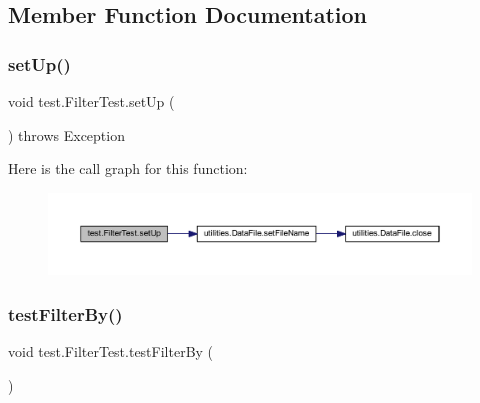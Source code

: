\subsection{Member Function Documentation}
\mbox{\label{classtest_1_1_filter_test_af76a634a6d91aad982f591ef07c21969}} 
\subsubsection{\texorpdfstring{set\+Up()}{setUp()}}
{\footnotesize\ttfamily void test.\+Filter\+Test.\+set\+Up (\begin{DoxyParamCaption}{ }\end{DoxyParamCaption}) throws Exception}

Here is the call graph for this function\+:\nopagebreak
\begin{figure}[H]
\begin{center}
\leavevmode
\includegraphics[width=350pt]{classtest_1_1_filter_test_af76a634a6d91aad982f591ef07c21969_cgraph}
\end{center}
\end{figure}
\mbox{\label{classtest_1_1_filter_test_abd2f49938ef9663ecee1953d09bae933}} 
\subsubsection{\texorpdfstring{test\+Filter\+By()}{testFilterBy()}}
{\footnotesize\ttfamily void test.\+Filter\+Test.\+test\+Filter\+By (\begin{DoxyParamCaption}{ }\end{DoxyParamCaption})}

